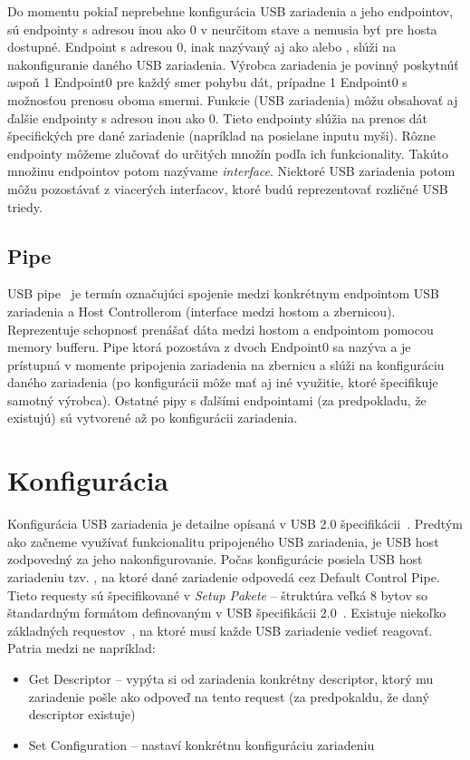 Do momentu pokiaľ neprebehne konfigurácia USB zariadenia a jeho endpointov, sú endpointy s adresou inou ako 0 v neurčitom stave a nemusia byť pre hosta dostupné. Endpoint s adresou 0, inak nazývaný aj ako  alebo , slúži na nakonfiguranie daného USB zariadenia. Výrobca zariadenia je povinný poskytnúť aspoň 1 Endpoint0 pre každý smer pohybu dát, prípadne 1 Endpoint0 s možnosťou prenosu oboma smermi. Funkcie (USB zariadenia) môžu obsahovať aj ďalšie endpointy s adresou inou ako 0. Tieto endpointy slúžia na prenos dát špecifických pre dané zariadenie (napríklad na posielane inputu myši). Rôzne endpointy môžeme zlučovať do určitých množín podľa ich funkcionality. Takúto množinu endpointov potom nazývame \textit{interface}. Niektoré USB zariadenia potom môžu pozostávať z viacerých interfacov, ktoré budú reprezentovať rozličné USB triedy.

\subsection*{Pipe}
USB pipe~\cite{usb_chap5_pipe} je termín označujúci spojenie medzi konkrétnym endpointom USB zariadenia a Host Controllerom (interface medzi hostom a zbernicou). Reprezentuje schopnosť prenášať dáta medzi hostom a endpointom pomocou memory bufferu. Pipe ktorá pozostáva z dvoch Endpoint0 sa nazýva  a je prístupná v momente pripojenia zariadenia na zbernicu a slúži na konfiguráciu daného zariadenia (po konfigurácii môže mať aj iné využitie, ktoré špecifikuje samotný výrobca). Ostatné pipy s ďalšími endpointami (za predpokladu, že existujú) sú vytvorené až po konfigurácii zariadenia. 



\section{Konfigurácia}
Konfigurácia USB zariadenia je detailne opísaná v USB 2.0 špecifikácii~\cite{usb_chap9_conf}. Predtým ako začneme využívať funkcionalitu pripojeného USB zariadenia, je USB host zodpovedný za jeho nakonfigurovanie. Počas konfigurácie posiela USB host zariadeniu tzv. , na ktoré dané zariadenie odpovedá cez Default Control Pipe. Tieto requesty sú špecifikované v \textit{Setup Pakete} -- štruktúra veľká 8 bytov so štandardným formátom definovaným v USB špecifikácii 2.0~\cite{usb_chap9_setup_pak}. Existuje niekoľko základných requestov~\cite{usb_chap9_device_req}, na ktoré musí každe USB zariadenie vedieť reagovať. Patria medzi ne napríklad:
\begin{itemize}
\item Get Descriptor -- vypýta si od zariadenia konkrétny descriptor, ktorý mu zariadenie pošle ako odpoveď na tento request (za predpokaldu, že daný descriptor existuje)
\item Set Configuration -- nastaví konkrétnu konfiguráciu zariadeniu
\end{itemize}


